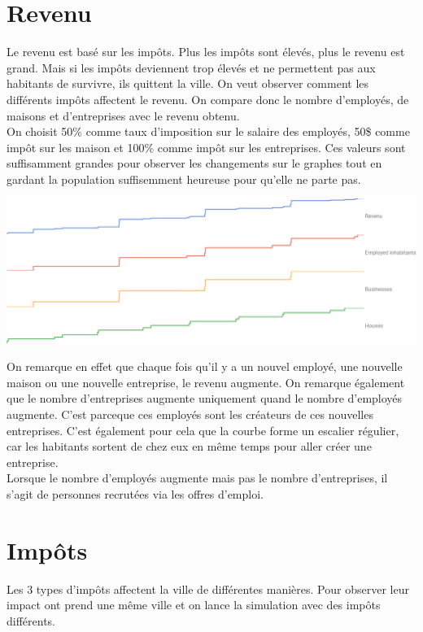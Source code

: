 \documentclass[11pt]{report}
\begin{document}
\section{Revenu}
Le revenu est basé sur les impôts. Plus les impôts sont élevés, plus le revenu est grand. Mais si les impôts deviennent trop élevés et ne permettent pas aux habitants de survivre, ils quittent la ville.
On veut observer comment les différents impôts affectent le revenu. On compare donc le nombre d'employés, de maisons et d'entreprises avec le revenu obtenu.\\
On choisit 50\% comme taux d'imposition sur le salaire des employés, 50\$ comme impôt sur les maison et 100\% comme impôt sur les entreprises. Ces valeurs sont suffisamment grandes pour observer les changements sur le graphes tout en gardant la population suffisemment heureuse pour qu'elle ne parte pas.
\begin{center}
	\includegraphics[width=\textwidth]{revenu}
\end{center}
On remarque en effet que chaque fois qu'il y a un nouvel employé, une nouvelle maison ou une nouvelle entreprise, le revenu augmente. On remarque également que le nombre d'entreprises augmente uniquement quand le nombre d'employés augmente. C'est parceque ces employés sont les créateurs de ces nouvelles entreprises. C'est également pour cela que la courbe forme un escalier régulier, car les habitants sortent de chez eux en même temps pour aller créer une entreprise.\\
Lorsque le nombre d'employés augmente mais pas le nombre d'entreprises, il s'agit de personnes recrutées via les offres d'emploi.


\newpage
\section{Impôts}
Les 3 types d'impôts affectent la ville de différentes manières. Pour observer leur impact ont prend une même ville et on lance la simulation avec des impôts différents.
\end{document}
